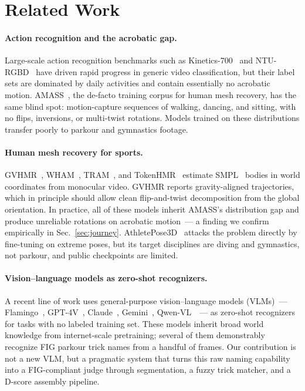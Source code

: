 \section{Related Work}
\label{sec:related}

\paragraph{Action recognition and the acrobatic gap.}
Large-scale action recognition benchmarks such as Kinetics-700~\cite{kay2017kinetics,carreira2019shortkinetics}
and NTU-RGBD~\cite{shahroudy2016ntu} have driven rapid progress in generic
video classification, but their label sets are dominated by daily activities
and contain essentially no acrobatic motion. AMASS~\cite{mahmood2019amass}, the
de-facto training corpus for human mesh recovery, has the same blind spot:
motion-capture sequences of walking, dancing, and sitting, with no flips,
inversions, or multi-twist rotations. Models trained on these distributions
transfer poorly to parkour and gymnastics footage.

\paragraph{Human mesh recovery for sports.}
GVHMR~\cite{shen2024gvhmr}, WHAM~\cite{shin2024wham}, TRAM~\cite{wang2024tram},
and TokenHMR~\cite{dwivedi2024tokenhmr} estimate SMPL~\cite{loper2015smpl}
bodies in world coordinates from monocular video. GVHMR reports
gravity-aligned trajectories, which in principle should allow clean
flip-and-twist decomposition from the global orientation. In practice, all of
these models inherit AMASS's distribution gap and produce unreliable
rotations on acrobatic motion~--- a finding we confirm empirically in
Sec.~\ref{sec:journey}. AthletePose3D~\cite{yeung2025athletepose3d} attacks
the problem directly by fine-tuning on extreme poses, but its target
disciplines are diving and gymnastics, not parkour, and public checkpoints
are limited.

\paragraph{Vision--language models as zero-shot recognizers.}
A recent line of work uses general-purpose vision--language models
(VLMs)~--- Flamingo~\cite{alayrac2022flamingo}, GPT-4V~\cite{openai2023gpt4v},
Claude~\cite{anthropic2024claude3}, Gemini~\cite{team2024gemini},
Qwen-VL~\cite{bai2023qwen}~--- as zero-shot recognizers for tasks with no
labeled training set. These models inherit broad world knowledge from
internet-scale pretraining; several of them demonstrably recognize FIG parkour
trick names from a handful of frames. Our contribution is not a new VLM, but
a pragmatic system that turns this raw naming capability into a
FIG-compliant judge through segmentation, a fuzzy trick matcher, and a
D-score assembly pipeline.

